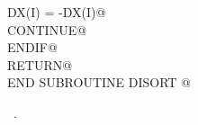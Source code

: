 \documentclass[10pt,a4paper,notitlepage]{article}
\begin{document}
\begin{flushleft}
\begin{list}{}{}
\mbox{}\verb@            DX(I) = -DX(I)@\\
\mbox{}    CONTINUE@\\
\mbox{}\verb@      ENDIF@\\
\mbox{}\verb@      RETURN@\\
\mbox{}\verb@      END      SUBROUTINE DISORT @\\
\mbox{}\verb@@{\NWsep}
\end{list}
\vspace{-1.5ex}
\footnotesize
\begin{list}{}{\setlength{\itemsep}{-\parsep}\setlength{\itemindent}{-\leftmargin}}
\item \NWtxtMacroRefIn\ .

\item{}
\end{list}
\vspace{4ex}
\end{flushleft}
\enddocument
\end{document}
